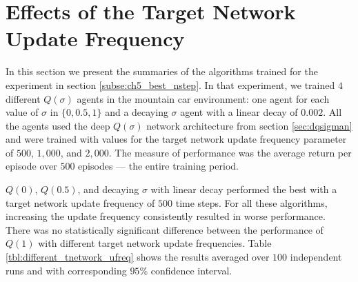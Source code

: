 \providecommand{\main}{..}



\chapter{Effects of the Target Network Update Frequency}

In this section we present the summaries of the algorithms trained for the experiment in section \ref{subse:ch5_best_nstep}.
In that experiment, we trained $4$ different $Q(\sigma)$ agents in the mountain car environment: one agent for each value of $\sigma$ in $\{ 0, 0.5, 1 \}$ and a decaying $\sigma$ agent with a linear decay of $0.002$. 
All the agents used the deep $Q(\sigma)$ network architecture from section \ref{sec:dqsigman} and were trained with values for the target network update frequency parameter of $500$, $1,000$, and $2,000$.
The measure of performance was the average return per episode over $500$ episodes --- the entire training period. 

$Q(0)$, $Q(0.5)$, and decaying $\sigma$ with linear decay performed the best with a target network update frequency of $500$ time steps.
For all these algorithms, increasing the update frequency consistently resulted in worse performance. 
There was no statistically significant difference between the performance of $Q(1)$ with different target network update frequencies.
Table \ref{tbl:different_tnetwork_ufreq} shows the results averaged over $100$ independent runs and with corresponding $95\%$ confidence interval.


